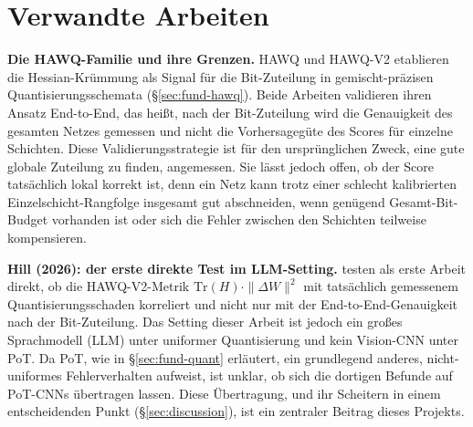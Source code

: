 \section{Verwandte Arbeiten}
\label{sec:related-work}

\textbf{Die HAWQ-Familie und ihre Grenzen.} HAWQ \citep{dong_hawq_2019} und HAWQ-V2 \citep{dong_hawqv2_2020} etablieren die Hessian-Krümmung als Signal für die Bit-Zuteilung in gemischt-präzisen Quantisierungsschemata (\S\ref{sec:fund-hawq}). Beide Arbeiten validieren ihren Ansatz End-to-End, das heißt, nach der Bit-Zuteilung wird die Genauigkeit des gesamten Netzes gemessen und nicht die Vorhersagegüte des Scores für einzelne Schichten. Diese Validierungsstrategie ist für den ursprünglichen Zweck, eine gute globale Zuteilung zu finden, angemessen. Sie lässt jedoch offen, ob der Score tatsächlich lokal korrekt ist, denn ein Netz kann trotz einer schlecht kalibrierten Einzelschicht-Rangfolge insgesamt gut abschneiden, wenn genügend Gesamt-Bit-Budget vorhanden ist oder sich die Fehler zwischen den Schichten teilweise kompensieren.
\par\medskip

\textbf{Hill (2026): der erste direkte Test im LLM-Setting.} \citet{hill2026saturationmakesquantizationerror} testen als erste Arbeit direkt, ob die HAWQ-V2-Metrik $\mathrm{Tr}(H)\cdot\|\Delta W\|^2$ mit tatsächlich gemessenem Quantisierungsschaden korreliert und nicht nur mit der End-to-End-Genauigkeit nach der Bit-Zuteilung. Das Setting dieser Arbeit ist jedoch ein großes Sprachmodell (LLM) unter uniformer Quantisierung und kein Vision-CNN unter PoT. Da PoT, wie in \S\ref{sec:fund-quant} erläutert, ein grundlegend anderes, nicht-uniformes Fehlerverhalten aufweist, ist unklar, ob sich die dortigen Befunde auf PoT-CNNs übertragen lassen. Diese Übertragung, und ihr Scheitern in einem entscheidenden Punkt (\S\ref{sec:discussion}), ist ein zentraler Beitrag dieses Projekts.
\par\medskip

